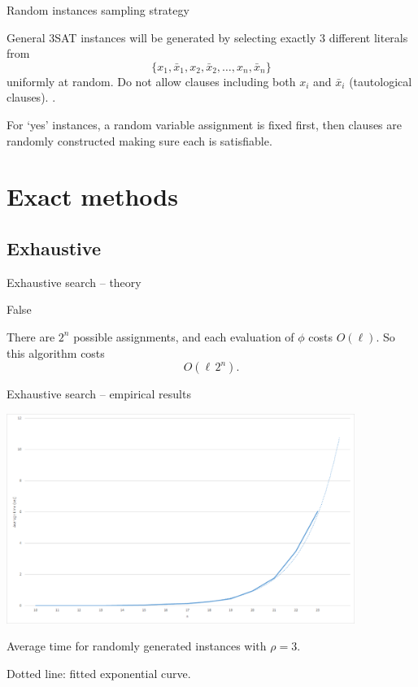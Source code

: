 \documentclass[aspectratio=169, compress, xcolor=table,xcolor=dvipsnames]{beamer}
\renewcommand{\lnot}{\bar}
\begin{document}
\begin{frame}
{Random instances sampling strategy}

General 3SAT instances will be generated by selecting exactly 3 different literals from
\[\{x_1, \lnot x_1, x_2, \lnot x_2, \ldots, x_n, \lnot x_n\}\]
uniformly at random.
Do not allow clauses including both $x_i$ and $\lnot x_i$ (tautological clauses).
\cite{sls book}.

\vfill

For `yes' instances, a random variable assignment is fixed first, then clauses are randomly constructed making sure each is satisfiable.

\end{frame}

%
%
%
%

\section{Exact methods}
\subsection{Exhaustive}

\begin{frame}
{Exhaustive search -- theory}

\begin{algorithmic}[1]\sffamily
{}
	\EndIf
\EndFor
\State \Return False
\end{algorithmic}

\vfill

There are $2^n$ possible assignments, and each  evaluation of $\phi$ costs $O(\ell)$. So this algorithm costs \[O(\ell\, 2^n).\]
\end{frame}

\begin{frame}
{Exhaustive search -- empirical results}

\begin{center}
\includegraphics[width=0.85\textwidth]{img/exhaustive}
\end{center}

Average time for randomly generated instances with $\rho=3$.

Dotted line: fitted exponential curve.

\end{frame}
\end{document}
